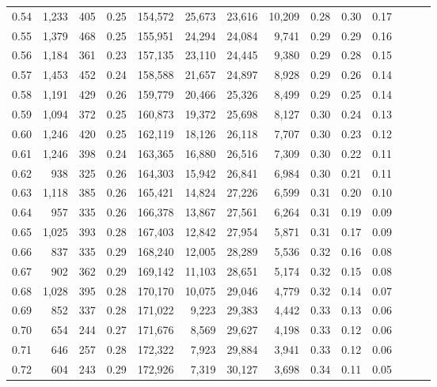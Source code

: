 \begin{tabular}{rrrrrrrrrrrrrr}
0.54 &  1,233 &  405 &  0.25 &  154,572 &   25,673 &  23,616 &  10,209 &  0.28 &  0.30 &      0.17 \\
0.55 &  1,379 &  468 &  0.25 &  155,951 &   24,294 &  24,084 &   9,741 &  0.29 &  0.29 &      0.16 \\
0.56 &  1,184 &  361 &  0.23 &  157,135 &   23,110 &  24,445 &   9,380 &  0.29 &  0.28 &      0.15 \\
0.57 &  1,453 &  452 &  0.24 &  158,588 &   21,657 &  24,897 &   8,928 &  0.29 &  0.26 &      0.14 \\
0.58 &  1,191 &  429 &  0.26 &  159,779 &   20,466 &  25,326 &   8,499 &  0.29 &  0.25 &      0.14 \\
0.59 &  1,094 &  372 &  0.25 &  160,873 &   19,372 &  25,698 &   8,127 &  0.30 &  0.24 &      0.13 \\
0.60 &  1,246 &  420 &  0.25 &  162,119 &   18,126 &  26,118 &   7,707 &  0.30 &  0.23 &      0.12 \\
0.61 &  1,246 &  398 &  0.24 &  163,365 &   16,880 &  26,516 &   7,309 &  0.30 &  0.22 &      0.11 \\
0.62 &    938 &  325 &  0.26 &  164,303 &   15,942 &  26,841 &   6,984 &  0.30 &  0.21 &      0.11 \\
0.63 &  1,118 &  385 &  0.26 &  165,421 &   14,824 &  27,226 &   6,599 &  0.31 &  0.20 &      0.10 \\
0.64 &    957 &  335 &  0.26 &  166,378 &   13,867 &  27,561 &   6,264 &  0.31 &  0.19 &      0.09 \\
0.65 &  1,025 &  393 &  0.28 &  167,403 &   12,842 &  27,954 &   5,871 &  0.31 &  0.17 &      0.09 \\
0.66 &    837 &  335 &  0.29 &  168,240 &   12,005 &  28,289 &   5,536 &  0.32 &  0.16 &      0.08 \\
0.67 &    902 &  362 &  0.29 &  169,142 &   11,103 &  28,651 &   5,174 &  0.32 &  0.15 &      0.08 \\
0.68 &  1,028 &  395 &  0.28 &  170,170 &   10,075 &  29,046 &   4,779 &  0.32 &  0.14 &      0.07 \\
0.69 &    852 &  337 &  0.28 &  171,022 &    9,223 &  29,383 &   4,442 &  0.33 &  0.13 &      0.06 \\
0.70 &    654 &  244 &  0.27 &  171,676 &    8,569 &  29,627 &   4,198 &  0.33 &  0.12 &      0.06 \\
0.71 &    646 &  257 &  0.28 &  172,322 &    7,923 &  29,884 &   3,941 &  0.33 &  0.12 &      0.06 \\
0.72 &    604 &  243 &  0.29 &  172,926 &    7,319 &  30,127 &   3,698 &  0.34 &  0.11 &      0.05 \\

\end{tabular}
